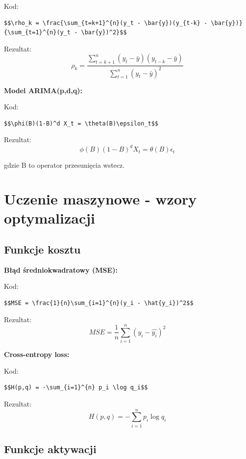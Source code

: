 \documentclass[
  polish,
  letterpaper,
  DIV=11,
  numbers=noendperiod]{scrreprt}
\begin{document}
Kod:

\begin{verbatim}
$$\rho_k = \frac{\sum_{t=k+1}^{n}(y_t - \bar{y})(y_{t-k} - \bar{y})}{\sum_{t=1}^{n}(y_t - \bar{y})^2}$$
\end{verbatim}

Rezultat:
\[\rho_k = \frac{\sum_{t=k+1}^{n}(y_t - \bar{y})(y_{t-k} - \bar{y})}{\sum_{t=1}^{n}(y_t - \bar{y})^2}\]

\textbf{Model ARIMA(p,d,q):}

Kod:

\begin{verbatim}
$$\phi(B)(1-B)^d X_t = \theta(B)\epsilon_t$$
\end{verbatim}

Rezultat: \[\phi(B)(1-B)^d X_t = \theta(B)\epsilon_t\]

gdzie B to operator przesunięcia wstecz.

\section{Uczenie maszynowe - wzory
optymalizacji}\label{uczenie-maszynowe---wzory-optymalizacji}

\subsection{Funkcje kosztu}\label{funkcje-kosztu}

\textbf{Błąd średniokwadratowy (MSE):}

Kod:

\begin{verbatim}
$$MSE = \frac{1}{n}\sum_{i=1}^{n}(y_i - \hat{y_i})^2$$
\end{verbatim}

Rezultat: \[MSE = \frac{1}{n}\sum_{i=1}^{n}(y_i - \hat{y_i})^2\]

\textbf{Cross-entropy loss:}

Kod:

\begin{verbatim}
$$H(p,q) = -\sum_{i=1}^{n} p_i \log q_i$$
\end{verbatim}

Rezultat: \[H(p,q) = -\sum_{i=1}^{n} p_i \log q_i\]

\subsection{Funkcje aktywacji}\label{funkcje-aktywacji}
\end{document}
